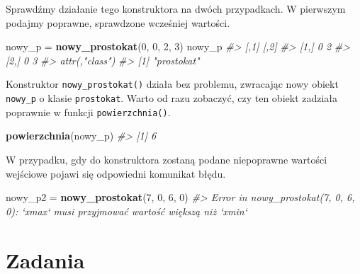 \documentclass[paper=6in:9in,pagesize=pdftex,headinclude=on,footinclude=on,10pt]{scrbook}
\newenvironment{Shaded}{\begin{snugshade}}{\end{snugshade}}
\newcommand{\CommentTok}[1]{\textcolor[rgb]{0.56,0.35,0.01}{\textit{#1}}}
\newcommand{\DecValTok}[1]{\textcolor[rgb]{0.00,0.00,0.81}{#1}}
\newcommand{\KeywordTok}[1]{\textcolor[rgb]{0.13,0.29,0.53}{\textbf{#1}}}
\newcommand{\NormalTok}[1]{#1}
\newcommand{\StringTok}[1]{\textcolor[rgb]{0.31,0.60,0.02}{#1}}
\begin{document}
Sprawdźmy działanie tego konstruktora na dwóch przypadkach.
W pierwszym podajmy poprawne, sprawdzone wcześniej wartości.

\begin{Shaded}
\begin{Highlighting}[]
\NormalTok{nowy_p =}\StringTok{ }\KeywordTok{nowy_prostokat}\NormalTok{(}\DecValTok{0}\NormalTok{, }\DecValTok{0}\NormalTok{, }\DecValTok{2}\NormalTok{, }\DecValTok{3}\NormalTok{)}
\NormalTok{nowy_p}
\CommentTok{#>      [,1] [,2]}
\CommentTok{#> [1,]    0    2}
\CommentTok{#> [2,]    0    3}
\CommentTok{#> attr(,"class")}
\CommentTok{#> [1] "prostokat"}
\end{Highlighting}
\end{Shaded}

Konstruktor \texttt{nowy\_prostokat()} działa bez problemu, zwracając nowy obiekt \texttt{nowy\_p} o klasie \texttt{prostokat}.
Warto od razu zobaczyć, czy ten obiekt zadziała poprawnie w funkcji \texttt{powierzchnia()}.

\begin{Shaded}
\begin{Highlighting}[]
\KeywordTok{powierzchnia}\NormalTok{(nowy_p)}
\CommentTok{#> [1] 6}
\end{Highlighting}
\end{Shaded}

W przypadku, gdy do konstruktora zostaną podane niepoprawne wartości wejściowe pojawi się odpowiedni komunikat błędu.

\begin{Shaded}
\begin{Highlighting}[]
\NormalTok{nowy_p2 =}\StringTok{ }\KeywordTok{nowy_prostokat}\NormalTok{(}\DecValTok{7}\NormalTok{, }\DecValTok{0}\NormalTok{, }\DecValTok{6}\NormalTok{, }\DecValTok{0}\NormalTok{)}
\CommentTok{#> Error in nowy_prostokat(7, 0, 6, 0): `xmax` musi przyjmować wartość większą niż `xmin`}
\end{Highlighting}
\end{Shaded}

\hypertarget{zadania}{%
\section{Zadania}\label{zadania}}
\end{document}

